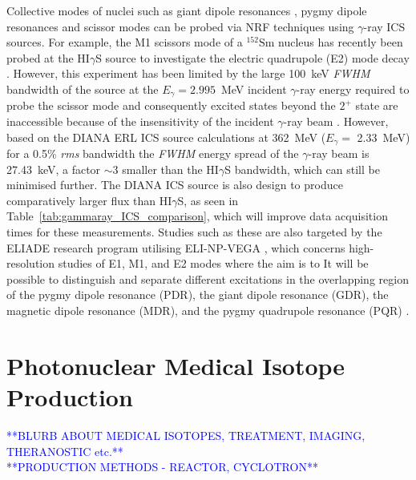 \documentclass[../main.tex]{subfiles}
\begin{document}
Collective modes of nuclei such as giant dipole resonances \cite{goldhaber1948nuclear,baldwin1947photo}, pygmy dipole resonances \cite{cook1957photodisintegration,tonchev2010spectral} and scissor modes \cite{de1984reformulation,bohle1984new} can be probed via NRF techniques using $\gamma$-ray ICS sources. For example, the M1 scissors mode of a $^{152}\textrm{Sm}$ nucleus has recently been probed at the HI$\gamma$S source to investigate the electric quadrupole (E2) mode decay \cite{ide20212}. However, this experiment has been limited by the large 100~\si{\kilo\electronvolt} \textit{FWHM} bandwidth \cite{ide20212} of the source at the $E_{\gamma} = 2.995$~\si{\mega\electronvolt} incident $\gamma$-ray energy required to probe the scissor mode \cite{ziegler1993low} and consequently excited states beyond the $2^{+}$ state are inaccessible because of the insensitivity of the incident $\gamma$-ray beam \cite{ide20212}. However, based on the DIANA ERL ICS source calculations at 362~\si{\mega\electronvolt} ($E_{\gamma} =$ 2.33~\si{\mega\electronvolt}) for a 0.5\% \textit{rms} bandwidth the \textit{FWHM} energy spread of the $\gamma$-ray beam is 27.43~\si{\kilo\electronvolt}, a factor $\sim3$ smaller than the HI$\gamma$S bandwidth, which can still be minimised further. The DIANA ICS source is also design to produce comparatively larger flux than HI$\gamma$S, as seen in Table~\ref{tab:gammaray_ICS_comparison}, which will improve data acquisition times for these measurements. Studies such as these are also targeted by the ELIADE research program utilising ELI-NP-VEGA \cite{elinp2019vega}, which concerns high-resolution studies of E1, M1, and E2 modes where the aim is to It will be possible to distinguish and separate different excitations in the overlapping region of the
pygmy dipole resonance (PDR), the giant dipole resonance (GDR), the magnetic dipole resonance (MDR), and the pygmy quadrupole resonance (PQR) \cite{tanaka2020current}.

\section{Photonuclear Medical Isotope Production}
\label{sec:photonuclear_medical_isotope_production}

\textcolor{blue}{**BLURB ABOUT MEDICAL ISOTOPES, TREATMENT, IMAGING, THERANOSTIC etc.**\\**PRODUCTION METHODS - REACTOR, CYCLOTRON**}
\end{document}
